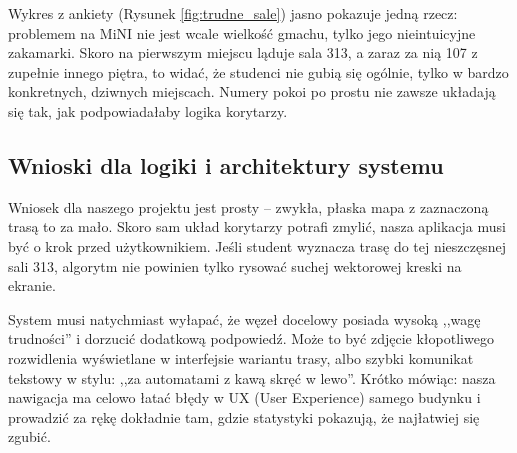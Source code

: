 \documentclass{article}
\begin{document}
Wykres z ankiety (Rysunek \ref{fig:trudne_sale}) jasno pokazuje jedną rzecz: problemem na MiNI nie jest wcale wielkość gmachu, tylko jego nieintuicyjne zakamarki. Skoro na pierwszym miejscu ląduje sala 313, a zaraz za nią 107 z zupełnie innego piętra, to widać, że studenci nie gubią się ogólnie, tylko w bardzo konkretnych, dziwnych miejscach. Numery pokoi po prostu nie zawsze układają się tak, jak podpowiadałaby logika korytarzy.

\subsection{Wnioski dla logiki i architektury systemu}
Wniosek dla naszego projektu jest prosty -- zwykła, płaska mapa z zaznaczoną trasą to za mało. Skoro sam układ korytarzy potrafi zmylić, nasza aplikacja musi być o krok przed użytkownikiem. Jeśli student wyznacza trasę do tej nieszczęsnej sali 313, algorytm nie powinien tylko rysować suchej wektorowej kreski na ekranie. 

System musi natychmiast wyłapać, że węzeł docelowy posiada wysoką ,,wagę trudności'' i dorzucić dodatkową podpowiedź. Może to być zdjęcie kłopotliwego rozwidlenia wyświetlane w interfejsie wariantu trasy, albo szybki komunikat tekstowy w stylu: ,,za automatami z kawą skręć w lewo''. Krótko mówiąc: nasza nawigacja ma celowo łatać błędy w UX (User Experience) samego budynku i prowadzić za rękę dokładnie tam, gdzie statystyki pokazują, że najłatwiej się zgubić.

\end{document}
